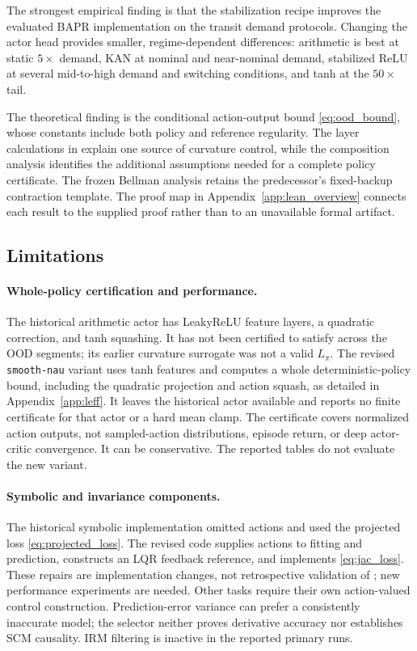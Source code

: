 \documentclass[10pt]{article}
\begin{document}
The strongest empirical finding is that the stabilization recipe improves the evaluated BAPR implementation on the transit demand protocols. Changing the actor head provides smaller, regime-dependent differences: arithmetic is best at static $5\times$ demand, KAN at nominal and near-nominal demand, stabilized ReLU at several mid-to-high demand and switching conditions, and tanh at the $50\times$ tail.

The theoretical finding is the conditional action-output bound \eqref{eq:ood_bound}, whose constants include both policy and reference regularity. The layer calculations in  explain one source of curvature control, while the composition analysis identifies the additional assumptions needed for a complete policy certificate. The frozen Bellman analysis retains the predecessor's fixed-backup contraction template. The proof map in Appendix~\ref{app:lean_overview} connects each result to the supplied proof rather than to an unavailable formal artifact.

\subsection{Limitations}
\label{sec:limitations}

\paragraph{Whole-policy certification and performance.}
The historical arithmetic actor has LeakyReLU feature layers, a quadratic correction, and tanh squashing. It has not been certified to satisfy  across the OOD segments; its earlier curvature surrogate was not a valid $L_\pi$. The revised \texttt{smooth-nau} variant uses tanh features and computes a whole deterministic-policy bound, including the quadratic projection and action squash, as detailed in Appendix~\ref{app:leff}. It leaves the historical actor available and reports no finite certificate for that actor or a hard mean clamp. The certificate covers normalized action outputs, not sampled-action distributions, episode return, or deep actor-critic convergence. It can be conservative. The reported tables do not evaluate the new variant.

\paragraph{Symbolic and invariance components.}
The historical symbolic implementation omitted actions and used the projected loss \eqref{eq:projected_loss}. The revised code supplies actions to fitting and prediction, constructs an LQR feedback reference, and implements \eqref{eq:jac_loss}. These repairs are implementation changes, not retrospective validation of ; new performance experiments are needed. Other tasks require their own action-valued control construction. Prediction-error variance can prefer a consistently inaccurate model; the selector neither proves derivative accuracy nor establishes SCM causality. IRM filtering is inactive in the reported primary runs.
\end{document}
